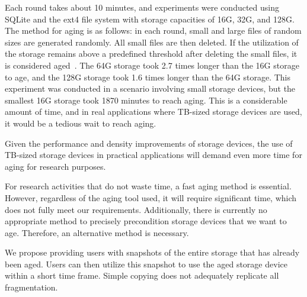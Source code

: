 Each round takes about 10 minutes, and experiments were conducted using SQLite and the ext4 file system with storage capacities of 16G, 32G, and 128G.
The method for aging is as follows: in each round, small and large files of random sizes are generated randomly. 
All small files are then deleted. If the utilization of the storage remains above a predefined threshold after deleting the small files, it is considered aged~\cite{Problem_in_SSD_Empirical}.
The 64G storage took 2.7 times longer than the 16G storage to age, and the 128G storage took 1.6 times longer than the 64G storage. 
This experiment was conducted in a scenario involving small storage devices, but the smallest 16G storage took 1870 minutes to reach aging. 
This is a considerable amount of time, and in real applications where TB-sized storage devices are used, it would be a tedious wait to reach aging.

Given the performance and density improvements of storage devices, the use of TB-sized storage devices in practical applications will demand even more time for aging for research purposes.


For research activities that do not waste time, a fast aging method is essential.
However, regardless of the aging tool used, it will require significant time, which does not fully meet our requirements.
Additionally, there is currently no appropriate method to precisely precondition storage devices that we want to age.
Therefore, an alternative method is necessary.

We propose providing users with snapshots of the entire storage that has already been aged.
Users can then utilize this snapshot to use the aged storage device within a short time frame.
Simple copying does not adequately replicate all fragmentation.

